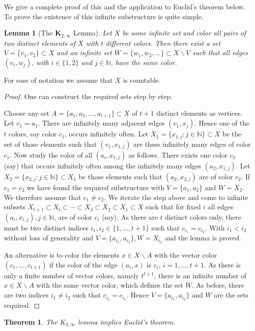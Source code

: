 \documentclass[12pt]{article}
\theoremstyle{theorem}
\newtheorem{theorem}{Theorem}
\newtheorem{lemma}{Lemma}
\theoremstyle{definition}
\newcommand{\N}{\mathbb N}
\begin{document}
We give a complete proof of this and the application to Euclid's theorem below.
To prove the existence of this infinite substructure is quite simple.
\begin{lemma}[The $\boldsymbol K_{2, \infty}$ Lemma]
Let $X$ be some infinite set and color all pairs of two distinct elements
of $X$
with $t$ different colors. Then there exist a set $V=\{v_1,v_2\}\subset X$ and
an infinite set $W=\{w_1,w_2, \ldots \}\subset X\backslash V$ such that all
edges $(v_i,w_j)$, with $i\in \{1,2\}$ and $j \in \N$, have the same color.
\end{lemma}
For ease of notation we assume that $X$ is countable.
\begin{proof}
One can construct the required sets step by step.

Choose any set $A=\{a_1, a_2, \ldots , a_{t+1}\}\subset X$ of $t+1$ distinct 
elements as vertices.
Let $v_1=a_1$. There are infinitely many adjacent edges $(v_1, x_j)$.
Hence one
of the $t$ colors, say color $c_1$, occurs infinitely often.
Let $X_1=\{x_{1,j}:j \in \N\} \subset X$ be the set of those elements such that
$(v_1, x_{1,j})$ are these infinitely many edges of color $c_1$.
Now study the color of all $(a_i, x_{1,j})$ as follows.
There exists one color $c_2$ (say) that occurs infinitely often among 
the infinitely many edges  $(a_2, x_{1,j})$. Let $X_2=\{x_{2,j}:j \in \N\} 
\subset X_1$ be those elements such that  $(a_2, x_{2,j})$ are of color $c_2$.
If $c_1=c_2$ we have found the
required substructure with $V=\{a_1,a_2\}$ and $W=X_2$.
We therefore assume that $c_1\neq c_2$.
We iterate the step above and come to infinite subsets
$X_{t+1} \subset X_t \subset \cdots \subset X_3\subset X_2 \subset X_1 
\subset X$ such that for fixed $i$ all 
edges $(a_i, x_{i,j}), j \in \N$, are of color $c_i$ (say).
As there are $t$ distinct colors only, there must be two distinct 
indices $i_1,i_2\in \{1, \ldots ,t+1\}$ such
that $c_{i_1}=c_{i_2}$. With $i_1 <i_2$ without loss of generality
and $V=\{a_{i_1}, a_{i_2}\}, W=X_{i_2}$ and the lemma is proved.

An alternative is to color the elements $x \in X\backslash A$ 
with the vector color $(c_1, \ldots, c_{t+1})$ if the color of the edge
$(a_i,x)$ is $c_i$, $i=1, \ldots , t+1$. 
As there is only a finite number of vector colors, namely
 $t^{t+1}$, there is an infinite
number of $x \in X\backslash A$ with the same vector color, which 
defines the set
$W$. As before, there
are two indices $i_1 \neq i_2$ such that $c_{i_1}=c_{i_2}$. Hence 
$V=\{a_{i_1}, a_{i_2}\}$ and $W$ are the sets required.
\end{proof}
\begin{theorem}{\label{thm:K2inf-implies-Euclid}}
The $K_{2,\infty}$ lemma implies Euclid's theorem.
\end{theorem}
\end{document}
